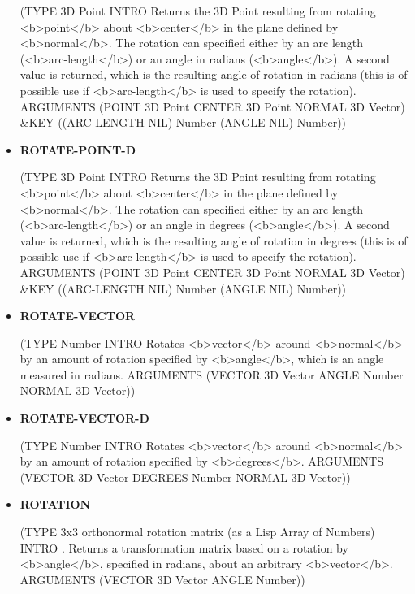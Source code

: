 \documentclass [11pt]{book}
\begin{document}
\begin{itemize}
(TYPE 3D Point INTRO  Returns the 3D Point resulting from rotating <b>point</b> about
<b>center</b> in the plane defined by <b>normal</b>. The rotation can specified
either by an arc length (<b>arc-length</b>) or an angle in radians (<b>angle</b>).
A second value is returned, which is the resulting angle of rotation in radians (this
is of possible use if <b>arc-length</b> is used to specify the rotation).
 ARGUMENTS (POINT 3D Point CENTER 3D Point NORMAL 3D Vector) \&KEY ((ARC-LENGTH NIL) Number (ANGLE NIL) Number))



\item {}
\label{prim:rotate-point-d}
\textbf{ROTATE-POINT-D}

(TYPE 3D Point INTRO  Returns the 3D Point resulting from rotating <b>point</b> about
<b>center</b> in the plane defined by <b>normal</b>. The rotation can specified
either by an arc length (<b>arc-length</b>) or an angle in degrees (<b>angle</b>).
A second value is returned, which is the resulting angle of rotation in degrees (this
is of possible use if <b>arc-length</b> is used to specify the rotation).
 ARGUMENTS (POINT 3D Point CENTER 3D Point NORMAL 3D Vector) \&KEY ((ARC-LENGTH NIL) Number (ANGLE NIL) Number))



\item {}
\label{prim:rotate-vector}
\textbf{ROTATE-VECTOR}

(TYPE Number INTRO  Rotates <b>vector</b> around <b>normal</b> by an amount of rotation
specified by <b>angle</b>, which is an angle measured in radians.
 ARGUMENTS (VECTOR 3D Vector ANGLE Number NORMAL 3D Vector))



\item {}
\label{prim:rotate-vector-d}
\textbf{ROTATE-VECTOR-D}

(TYPE Number INTRO  Rotates <b>vector</b> around <b>normal</b> by an amount of rotation
specified by <b>degrees</b>.
 ARGUMENTS (VECTOR 3D Vector DEGREES Number NORMAL 3D Vector))



\item {}
\label{prim:rotation}
\textbf{ROTATION}

(TYPE 3x3 orthonormal rotation matrix (as a Lisp Array of Numbers) INTRO .
Returns a transformation matrix based on a rotation by <b>angle</b>,
specified in radians, about an arbitrary <b>vector</b>.
 ARGUMENTS (VECTOR 3D Vector ANGLE Number))




\end{itemize}
\end{document}
